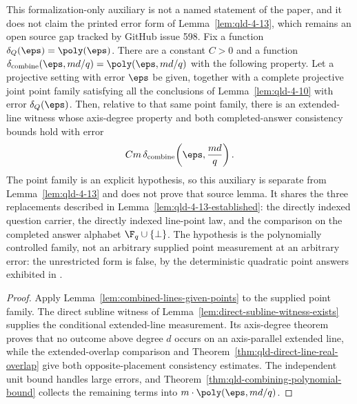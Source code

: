 \begin{example}
	\label{lem:qld-4-13-established-given-points}
	\leanok
	This formalization-only auxiliary is not a named statement of the paper, and it
	does not claim the printed error form of Lemma~\ref{lem:qld-4-13}, which remains
	an open source gap tracked by GitHub issue 598.
	Fix a function $\delta_Q(\eps)=\poly(\eps)$. There are a constant $C>0$ and a
	function $\delta_{\mathrm{combine}}(\eps,md/q)=\poly(\eps,md/q)$ with the
	following property. Let a projective setting with error $\eps$ be given,
	together with a complete projective joint point family satisfying all the
	conclusions of Lemma~\ref{lem:qld-4-10} with error $\delta_Q(\eps)$. Then,
	relative to that same point family, there is an extended-line witness whose
	axis-degree property and both completed-answer consistency bounds hold with
	error
	\[
		C m\,\delta_{\mathrm{combine}}\!\left(\eps,\frac{md}{q}\right).
	\]
	The point family is an explicit hypothesis, so this auxiliary is separate from
	Lemma~\ref{lem:qld-4-13} and does not prove that source lemma. It shares the
	three replacements described in Lemma~\ref{lem:qld-4-13-established}: the
	directly indexed question carrier, the directly indexed line-point law, and the
	comparison on the completed answer alphabet $\F_q\cup\{\bot\}$.
	The hypothesis is the polynomially controlled family, not an arbitrary supplied
	point measurement at an arbitrary error: the unrestricted form is false, by the
	deterministic quadratic point answers exhibited in
	\cite{gap:qpbt_combined-lines-error-term}.
\end{example}
\begin{proof}
	\leanok
	Apply Lemma~\ref{lem:combined-lines-given-points} to the supplied point family.
	The direct subline witness of Lemma~\ref{lem:direct-subline-witness-exists}
	supplies the conditional extended-line measurement. Its axis-degree theorem
	proves that no outcome above degree $d$ occurs on an axis-parallel extended
	line, while the extended-overlap comparison and
	Theorem~\ref{thm:qld-direct-line-real-overlap} give both opposite-placement
	consistency estimates. The independent unit bound handles large errors, and
	Theorem~\ref{thm:qld-combining-polynomial-bound} collects the remaining terms
	into $m\cdot\poly(\eps,md/q)$.
\end{proof}


